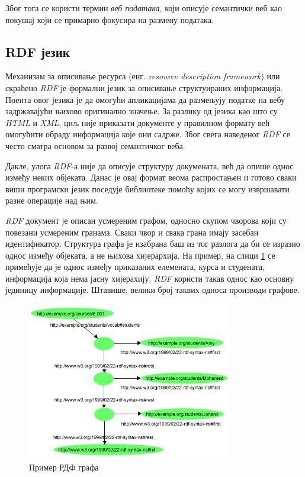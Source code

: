 \documentclass[12pt,oneside]{memoir}
\begin{document}
Због тога се користи термин \textit{веб података}, који описује семантички веб као покушај који се примарно фокусира на размену података. 

\subsection{RDF језик}
\label{subsec:semantic_rdf}

Механизам за описивање ресурса (енг. \textit{resource description framework}) или скраћено \textit{RDF} је формални језик за описивање структуираних информација. Поента овог језика је да омогући апликацијама да размењују податке на вебу задржавајући њихово оригинално значење. За разлику од језика као што су \textit{HTML} и \textit{XML}, циљ није приказати документе у правилном формату већ омогућити обраду информација које они садрже. Због свега наведеног \textit{RDF} се често сматра основом за развој семантичког веба. \cite{semantic}

Дакле, улога \textit{RDF}-а није да описује структуру докумената, већ да опише однос између неких објеката. Данас је овај формат веома распростањен и готово сваки виши програмски језик поседује библиотеке помоћу којих се могу извршавати разне операције над њим. \cite{semantic}
 
\textit{RDF} документ је описан усмереним графом, односно скупом чворова који су повезани усмереним гранама. Сваки чвор и свака грана имају засебан идентификатор. Структура графа је изабрана баш из тог разлога да би се изразио однос између објеката, а не њихова хијерархија. На пример, на слици \ref{fig:semantic_rdf_graph_example} се примећује да је однос између приказаних елемената, курса и студената, информација која нема јасну хијерахију. \textit{RDF} користи такав однос као основну јединицу информације. Штавише, велики број таквих односа производи графове. \cite{semantic}

\begin{figure}[!ht]
  \centering
  \includegraphics[width=0.8\textwidth]{pictures/rdf_graph_example.png}
  \caption{Пример РДФ графа}
  \label{fig:semantic_rdf_graph_example}
\end{figure}
\end{document}
